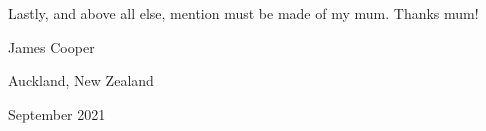 
Lastly, and above all else, mention must be made of my mum.  Thanks mum!

\vspace{1cm}
\hfill James Cooper

\hfill Auckland, New Zealand

\hfill September 2021

